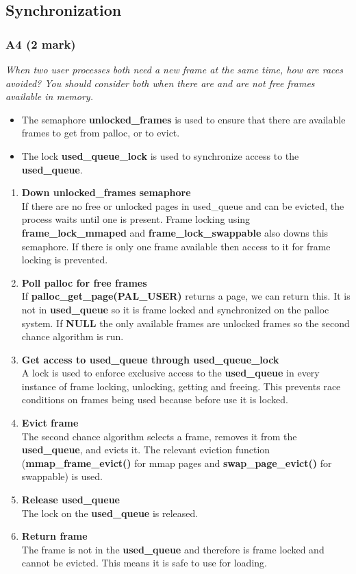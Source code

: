 \documentclass{report}
\newcommand{\question}[1]{\textit{#1} \ }
\newcommand{\bullpara}[2]{\item \textbf{#1} \ #2}
\newcommand{\fun}[1]{\textcolor{Emerald}{\textbf{#1}}}
\newcommand{\var}[1]{\textcolor{RoyalPurple}{\textbf{#1}}}
\newcommand{\const}[1]{\textcolor{BrickRed}{\textbf{#1}}}
\newcommand{\compitem}[1]{\begin{itemize}\setlength\itemsep{-0.1em}#1\end{itemize}}
\newcommand{\compenum}[1]{\begin{enumerate}\setlength\itemsep{-0.1em}#1\end{enumerate}}
\begin{document}
		\subsection*{Synchronization}
			\subsubsection*{A4 (2 mark)}
				\question{When two user processes both need a new frame at 
				the same time, how are races avoided? You should consider both 
				when there are and are not free frames available in memory.}
				
				\compitem{
					\item The semaphore \var{unlocked\_frames} is used 
					to ensure that there are available frames to get from 
					palloc, or to evict.
					\item The lock \var{used\_queue\_lock} is used to 
					synchronize access to the \var{used\_queue}.
				}
				\compenum {
					\bullpara{Down \var{unlocked\_frames} semaphore}{
						\\ If there are no free or unlocked pages in used\_queue
						and can be evicted, the process waits until one is present. 
						Frame locking using \fun{frame\_lock\_mmaped} and 
						\fun{frame\_lock\_swappable} also downs this semaphore.
						If there is only one frame available then access to it
						for frame locking is prevented.
					}
					\bullpara{Poll palloc for free frames}{
						\\ If \fun{palloc\_get\_page(\const{PAL\_USER})} returns
						a page, we can return this. It is not in 
						\var{used\_queue} so it is frame locked and 
						synchronized on the palloc system. If \const{NULL} the 
						only available frames are unlocked frames so the second 
						chance algorithm is run.
					}
					\bullpara{Get access to \var{used\_queue} through \var{used\_queue\_lock}}{
						\\ A lock is used to enforce exclusive access to the 
						\var{used\_queue} in every instance of frame locking,
						unlocking, getting and freeing. This prevents race 
						conditions on frames being used because before
						use it is locked.
					} 
					\bullpara{Evict frame}{
						\\ The second chance algorithm selects a frame,
						removes it from the \var{used\_queue}, and evicts it.
						The relevant eviction function (\fun{mmap\_frame\_evict()} 
						for mmap pages and \fun{swap\_page\_evict()} for swappable)
						is used.
					}
					\bullpara{Release \var{used\_queue}}{
						\\ The lock on the \var{used\_queue} is released.
					}
					\bullpara{Return frame}{
						\\ The frame is not in the \var{used\_queue} and therefore
						is frame locked and cannot be evicted.
						This means it is safe to use for loading.
					}
				}
\end{document}
